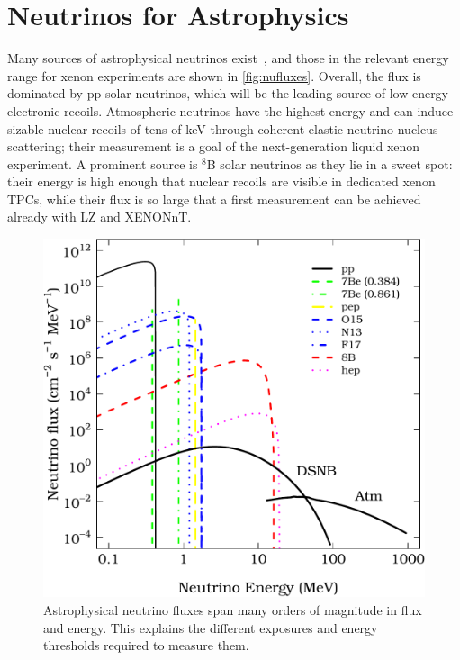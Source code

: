 \section{Neutrinos for Astrophysics} \label{sec:neutrinos}

Many sources of astrophysical neutrinos exist~\cite{Vitagliano:2019yzm,Gann:2021ndb}, and those in the relevant energy range for xenon experiments are shown in \autoref{fig:nufluxes}. Overall, the flux is dominated by pp solar neutrinos, which will be the leading source of low-energy electronic recoils. Atmospheric neutrinos have the highest energy and can induce sizable nuclear recoils of tens of keV through coherent elastic neutrino-nucleus scattering; their measurement is a goal of the next-generation liquid xenon experiment. A prominent source is $^8$B solar neutrinos as they lie in a sweet spot: their energy is high enough that nuclear recoils are visible in dedicated xenon TPCs, while their flux is so large that a first measurement can be achieved already with LZ and XENONnT.

\begin{figure}[!htbp]
\begin{center}
\includegraphics[width=0.99\columnwidth]{fig_nufluxes.pdf}
\caption{Astrophysical neutrino fluxes span many orders of magnitude in flux and energy. This explains the different exposures and energy thresholds required to measure them.}\label{fig:nufluxes}
\end{center}
\end{figure}

